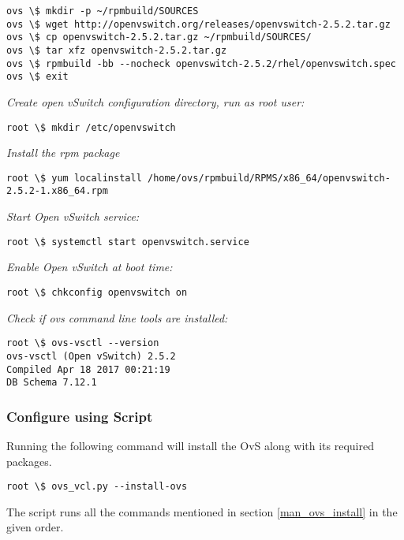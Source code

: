 \documentclass[12pt]{extarticle}
\begin{document}
\begin{verbatim}
ovs \$ mkdir -p ~/rpmbuild/SOURCES
ovs \$ wget http://openvswitch.org/releases/openvswitch-2.5.2.tar.gz
ovs \$ cp openvswitch-2.5.2.tar.gz ~/rpmbuild/SOURCES/
ovs \$ tar xfz openvswitch-2.5.2.tar.gz
ovs \$ rpmbuild -bb --nocheck openvswitch-2.5.2/rhel/openvswitch.spec
ovs \$ exit
\end{verbatim}

\noindent
\textit{Create open vSwitch configuration directory, run as root user:}

\noindent
\begin{verbatim}
root \$ mkdir /etc/openvswitch
\end{verbatim}

\noindent
\textit{Install the rpm package}
\begin{verbatim}
root \$ yum localinstall /home/ovs/rpmbuild/RPMS/x86_64/openvswitch-2.5.2-1.x86_64.rpm
\end{verbatim}

\noindent
\textit{Start Open vSwitch service:}
\begin{verbatim}
root \$ systemctl start openvswitch.service
\end{verbatim}

\noindent
\textit{Enable Open vSwitch at boot time:}
\begin{verbatim}
root \$ chkconfig openvswitch on
\end{verbatim}

\noindent
\textit{Check if ovs command line tools are installed:}
\begin{verbatim}
root \$ ovs-vsctl --version
ovs-vsctl (Open vSwitch) 2.5.2
Compiled Apr 18 2017 00:21:19
DB Schema 7.12.1
\end{verbatim}

\subsubsection{Configure using Script}
Running the following command will install the OvS along with its required packages.
\begin{verbatim}
root \$ ovs_vcl.py --install-ovs   
\end{verbatim}

\noindent
The script runs all the commands mentioned in section  \ref{man_ovs_install} in the given order.
\end{document}
